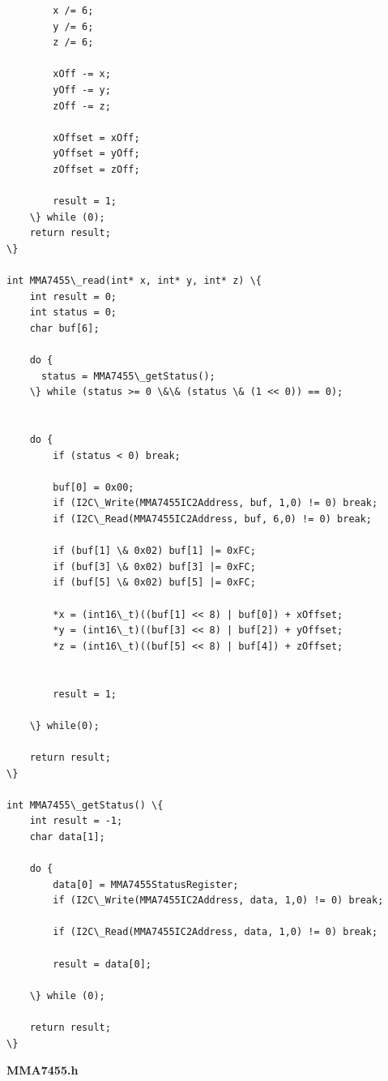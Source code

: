 \documentclass{article}
\begin{document}
\begin{lstlisting}
        x /= 6;
        y /= 6;
        z /= 6;

        xOff -= x;
        yOff -= y;
        zOff -= z;

        xOffset = xOff;
        yOffset = yOff;
        zOffset = zOff;

        result = 1;
    \} while (0);
    return result;
\}

int MMA7455\_read(int* x, int* y, int* z) \{
	int result = 0;
	int status = 0;
	char buf[6];

    do {
      status = MMA7455\_getStatus();
    \} while (status >= 0 \&\& (status \& (1 << 0)) == 0);


    do {
        if (status < 0) break;

        buf[0] = 0x00;
        if (I2C\_Write(MMA7455IC2Address, buf, 1,0) != 0) break;
        if (I2C\_Read(MMA7455IC2Address, buf, 6,0) != 0) break;

        if (buf[1] \& 0x02) buf[1] |= 0xFC;
        if (buf[3] \& 0x02) buf[3] |= 0xFC;
        if (buf[5] \& 0x02) buf[5] |= 0xFC;

        *x = (int16\_t)((buf[1] << 8) | buf[0]) + xOffset;
        *y = (int16\_t)((buf[3] << 8) | buf[2]) + yOffset;
        *z = (int16\_t)((buf[5] << 8) | buf[4]) + zOffset;


        result = 1;

    \} while(0);

    return result;
\}

int MMA7455\_getStatus() \{
    int result = -1;
    char data[1];

    do {
        data[0] = MMA7455StatusRegister;
        if (I2C\_Write(MMA7455IC2Address, data, 1,0) != 0) break;

        if (I2C\_Read(MMA7455IC2Address, data, 1,0) != 0) break;

        result = data[0];

    \} while (0);

    return result;
\}

\end{lstlisting}
\linebreak
\textbf{MMA7455.h}
\end{document}
